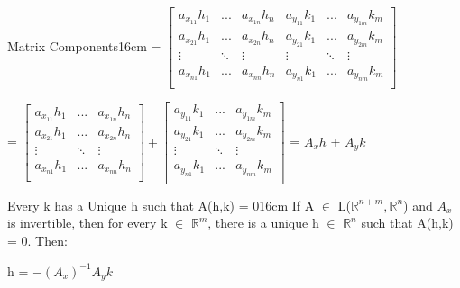 \begin{definition}{Matrix Components}{16cm}
        \hspace{0.9cm}
        =
        $\begin{bmatrix}
            a_{x_{11}}h_1 & ... & a_{x_{1n}}h_n
                & a_{y_{11}}k_1 & ... & a_{y_{1m}}k_m \\
            a_{x_{21}}h_1 & ... & a_{x_{2n}}h_n
                & a_{y_{21}}k_1 & ... & a_{y_{2m}}k_m \\
            \vdots & \ddots & \vdots & \vdots & \ddots & \vdots \\
            a_{x_{n1}}h_1 & ... & a_{x_{nn}}h_n
                & a_{y_{n1}}k_1 & ... & a_{y_{nm}}k_m \\
        \end{bmatrix}$

        \hspace{0.9cm}
        =
        $\begin{bmatrix}
            a_{x_{11}}h_1 & ... & a_{x_{1n}}h_n \\
            a_{x_{21}}h_1 & ... & a_{x_{2n}}h_n \\
            \vdots & \ddots & \vdots \\
            a_{x_{n1}}h_1 & ... & a_{x_{nn}}h_n \\
        \end{bmatrix}
        +
        \begin{bmatrix}
            a_{y_{11}}k_1 & ... & a_{y_{1m}}k_m \\
            a_{y_{21}}k_1 & ... & a_{y_{2m}}k_m \\
            \vdots & \ddots & \vdots \\
            a_{y_{n1}}k_1 & ... & a_{y_{nm}}k_m \\
        \end{bmatrix}$
        = $A_xh$ + $A_yk$
    \end{definition}

    \newpage



    \begin{wtheorem}{Every k has a Unique h such that A(h,k) = 0}{16cm}
        If A $\in$ L($\mathbb{R}^{n+m},\mathbb{R}^n$)
        and $A_x$ is invertible, then for every k $\in$ $\mathbb{R}^m$,
        there is a unique h $\in$ $\mathbb{R}^n$ such that A(h,k) = 0. Then:

        \hspace{0.5cm}
        h = $-(A_x)^{-1}A_yk$
    \end{wtheorem}

